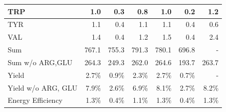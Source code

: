 \documentclass[12pt]{article}
\begin{document}
\begin{table}
\begin{tabular}{lrrrrrr}
        TRP & 1.0 & 0.3 & 0.8 & 1.0 & 0.2 & 1.2 \\ \hline
        TYR & 1.1 & 0.4 & 1.1 & 1.1 & 0.4 & 0.6 \\ \hline
        VAL & 1.4 & 0.4 & 1.2 & 1.5 & 0.4 & 2.4 \\ \midrule
        Sum & 767.1 & 755.3 & 791.3 & 780.1 & 696.8 & - \\ \hline
        Sum w/o ARG,GLU & 264.3 & 249.3 & 262.0 & 264.6 & 193.7 & 263.7 \\ \midrule
        Yield & 2.7\% & 0.9\% & 2.3\% & 2.7\% & 0.7\% & - \\ \hline
        Yield w/o ARG, GLU & 7.9\% & 2.6\% & 6.9\% & 8.1\% & 2.7\% & 8.2\% \\ \midrule
        Energy Efficiency & 1.3\% & 0.4\% & 1.1\% & 1.3\% & 0.4\% & 1.3\% \\ \bottomrule
    \end{tabular}
\label{tbl:yield_breakdown}
\end{table}
\end{document}
